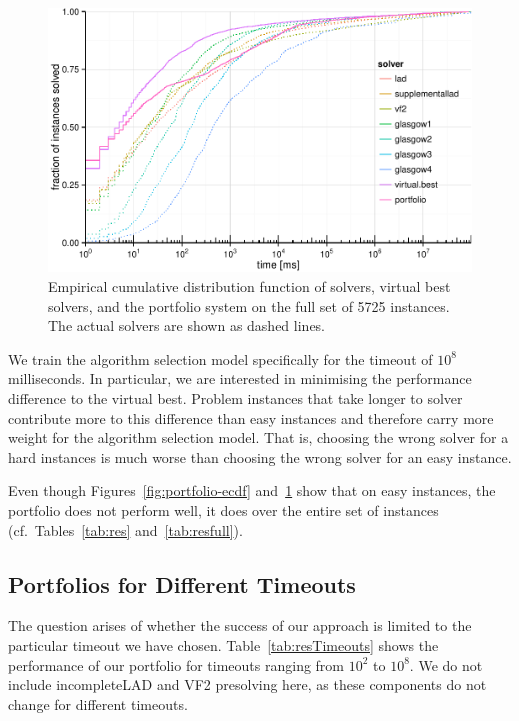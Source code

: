 \documentclass{llncs}
\begin{document}
\begin{figure}[!ht]
\includegraphics[width=\textwidth]{figures/portfolio-ecdf-full}
\caption{Empirical cumulative distribution function of solvers, virtual best
solvers, and the portfolio system on the full set of 5725 instances. The
actual solvers are shown as dashed lines.}
\label{fig:portfolio-ecdf-full}
\end{figure}

We train the algorithm selection model specifically for the timeout of $10^8$
milliseconds. In particular, we are interested in minimising the performance
difference to the virtual best. Problem instances that take longer to solver
contribute more to this difference than easy instances and therefore carry more
weight for the algorithm selection model. That is, choosing the wrong solver for
a hard instances is much worse than choosing the wrong solver for an easy
instance.

Even though Figures~\ref{fig:portfolio-ecdf} and~\ref{fig:portfolio-ecdf-full}
show that on easy instances, the portfolio does not perform well, it does over
the entire set of instances (cf.\ Tables~\ref{tab:res} and~\ref{tab:resfull}).

\subsection{Portfolios for Different Timeouts}

The question arises of whether the success of our approach is limited to the
particular timeout we have chosen. Table~\ref{tab:resTimeouts} shows the
performance of our portfolio for timeouts ranging from $10^2$ to $10^8$. We
do not include incompleteLAD and VF2 presolving here, as these components do not
change for different timeouts.
\end{document}
